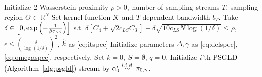 \documentclass[journal,onecolumn]{IEEEtran}
\newcommand{\step}{\epsilon}
\newcommand{\reals}{\mathbb{R}}
\newcommand{\dimn}{N}
\newcommand{\LSconst}{c_{LS}}
\newcommand{\ids}{\pi}
\newcommand{\idw}{\gamma}
\newcommand{\isp}{0,\idw}
\newcommand{\mk}{\mathcal{K}}
\newcommand{\idistrw}{\ids_{\isp}}
\newcommand{\wassprox}{\rho}
\newcommand{\snum}{T}
\newcommand{\hk}{\hat{k}}
\newcommand{\algtdum}{q}
\begin{document}
\begin{algorithm}[t]
{\color{black}
\caption{\color{black}{Cost Reconstruction by Sequential-Sampling Kernel Density Estimation}}\label{alg:costrec}
\begin{algorithmic}[1]
\State Initialize 2-Wasserstein proximity $\wassprox > 0$, number of sampling streams $\snum$, sampling region $\Theta \subset \reals^{\dimn}$
\State \textcolor{black}{Set kernel function $\mk$ and $T$-dependent bandwidth $b_T$.}
\State Take $\delta \in \textcolor{black}{\left[0, \exp\left(-\frac{1}{\beta \LSconst}\right) \right]}$ s.t. $\delta\left[C_4 + \sqrt{2\LSconst C_3} \right] + \delta\sqrt{10\LSconst\dimn\log\left(1/\delta\right)} \leq \wassprox$, \,\,$\step \leq \left(\frac{\delta}{\log(1/\delta)} \right)^2$, $\hk$ as \eqref{eq:itspec} 
\State Initialize parameters $\Delta, \gamma$ as \eqref{eq:delspec}, \eqref{eq:omegaspec}, respectively.
\State Set $k=0, \,S=\emptyset, \,\algtdum=0$.
\State \textcolor{black}{Initialize $i$'th PSGLD (Algorithm~\ref{alg:psgld}) stream by $\alpha_0^i \overset{\textcolor{black}{i.i.d.}}{\sim} \idistrw$}.



\end{algorithmic}}
\end{algorithm}
\end{document}
